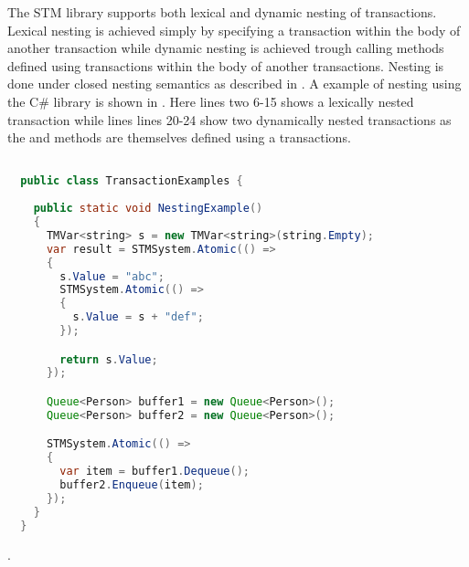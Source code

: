 The \ac{STM} library supports both lexical and dynamic nesting of transactions. Lexical nesting is achieved simply by specifying a transaction within the body of another transaction while dynamic nesting is achieved trough calling methods defined using transactions within the body of another transactions. Nesting is done under closed nesting semantics as described in . A example of nesting using the C\# library is shown in . Here lines two 6-15 shows a lexically nested transaction while lines lines 20-24 show two dynamically nested transactions as the  and  methods are themselves defined using a transactions. 
\begin{lstlisting}[label=lst:library_nesting,
  caption={Library Nesting},
  language=Java,  
  showspaces=false,
  showtabs=false,
  breaklines=true,
  showstringspaces=false,
  breakatwhitespace=true,
  commentstyle=\color{greencomments},
  keywordstyle=\color{bluekeywords},
  stringstyle=\color{redstrings},
  morekeywords={atomic, retry, orElse, var, get, set}]  % Start your code-block

  public class TransactionExamples {
    
    public static void NestingExample()
    {
      TMVar<string> s = new TMVar<string>(string.Empty);
      var result = STMSystem.Atomic(() =>
      {
        s.Value = "abc";
        STMSystem.Atomic(() =>
        {
          s.Value = s + "def";
        });

        return s.Value;
      });

      Queue<Person> buffer1 = new Queue<Person>();
      Queue<Person> buffer2 = new Queue<Person>();

      STMSystem.Atomic(() =>
      {
        var item = buffer1.Dequeue();
        buffer2.Enqueue(item);
      });
    }
  }
\end{lstlisting}

.
\worksheetend